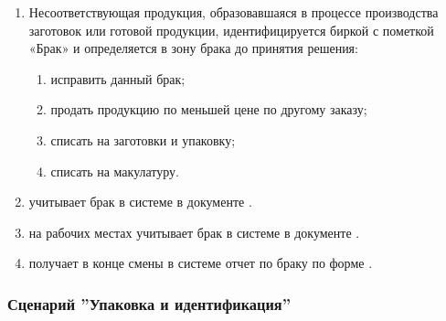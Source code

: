 \begin{enumerate}
\item	Несоответствующая продукция, образовавшаяся в процессе производства заготовок или готовой продукции, идентифицируется биркой с пометкой «Брак» и определяется в зону брака до принятия решения:

\begin{enumerate}
    \item исправить данный брак;
    \item продать продукцию по меньшей цене по другому заказу;
    \item списать на заготовки и упаковку;
    \item списать на макулатуру.
\end{enumerate}
\item	\gaoperator учитывает брак в системе \gofro в документе .
\item	\operator на  рабочих местах учитывает брак в системе \gofro в документе .
\item	\master  получает в конце смены в системе \gofro отчет по браку по форме .



\end{enumerate}



\subsubsection{Сценарий ''Упаковка и идентификация''}
\label{bp:production_40}

